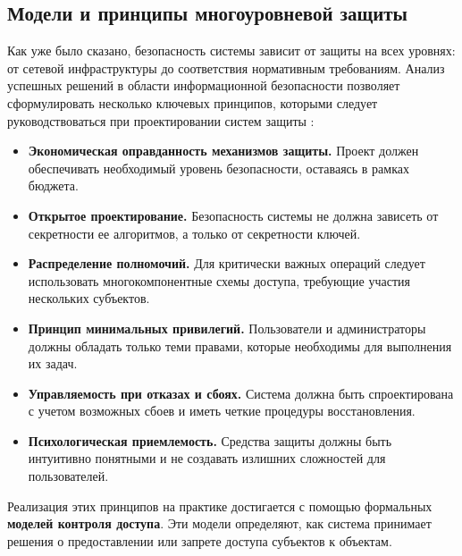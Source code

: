 \subsection{Модели и принципы многоуровневой защиты}\label{sec:multilevel_models}
Как уже было сказано, безопасность системы зависит от защиты на всех уровнях: от сетевой инфраструктуры до соответствия нормативным требованиям. Анализ успешных решений в области информационной безопасности позволяет сформулировать несколько ключевых принципов, которыми следует руководствоваться при проектировании систем защиты \autocite{Smirnov2007}:
\begin{itemize}
	\item \textbf{Экономическая оправданность механизмов защиты.} Проект должен обеспечивать необходимый уровень безопасности, оставаясь в рамках бюджета.
	\item \textbf{Открытое проектирование.} Безопасность системы не должна зависеть от секретности ее алгоритмов, а только от секретности ключей.
	\item \textbf{Распределение полномочий.} Для критически важных операций следует использовать многокомпонентные схемы доступа, требующие участия нескольких субъектов.
	\item \textbf{Принцип минимальных привилегий.} Пользователи и администраторы должны обладать только теми правами, которые необходимы для выполнения их задач.
	\item \textbf{Управляемость при отказах и сбоях.} Система должна быть спроектирована с учетом возможных сбоев и иметь четкие процедуры восстановления.
	\item \textbf{Психологическая приемлемость.} Средства защиты должны быть интуитивно понятными и не создавать излишних сложностей для пользователей.
\end{itemize}

Реализация этих принципов на практике достигается с помощью формальных \textbf{моделей контроля доступа}. Эти модели определяют, как система принимает решения о предоставлении или запрете доступа субъектов к объектам.

